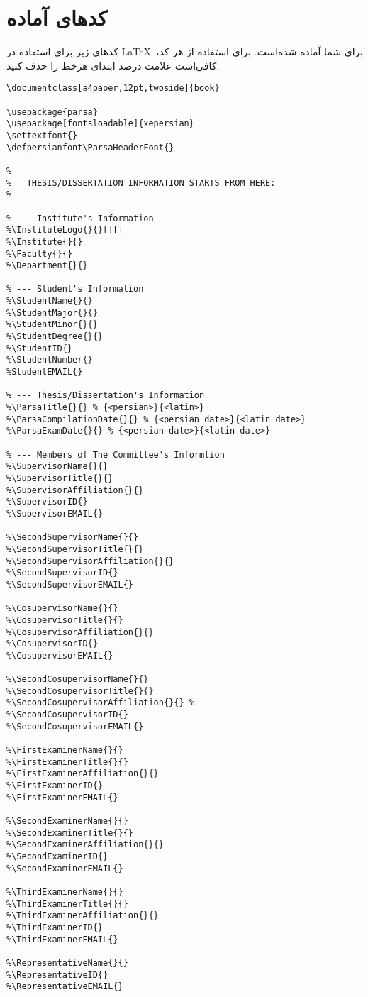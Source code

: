 \documentclass[12pt,a4paper,twoside,fleqn,notitlepage,openany]{extbook}
\begin{document}
\section{کدهای آماده}
کدهای زیر برای استفاده در \LaTeX ~برای شما آماده شده‌است. برای استفاده از هر کد، کافی‌است علامت درصد ابتدای هرخط را حذف کنید.
\begin{latin}
\begin{verbatim}
\documentclass[a4paper,12pt,twoside]{book}

\usepackage{parsa}
\usepackage[fontsloadable]{xepersian}
\settextfont{} 
\defpersianfont\ParsaHeaderFont{} 

%
%	THESIS/DISSERTATION INFORMATION STARTS FROM HERE:
%

% --- Institute's Information
%\InstituteLogo{}{}[][] 
%\Institute{}{}
%\Faculty{}{}
%\Department{}{} 

% --- Student's Information
%\StudentName{}{} 
%\StudentMajor{}{}
%\StudentMinor{}{}
%\StudentDegree{}{}
%\StudentID{}
%\StudentNumber{}
%StudentEMAIL{}

% --- Thesis/Dissertation's Information
%\ParsaTitle{}{} % {<persian>}{<latin>}
%\ParsaCompilationDate{}{} % {<persian date>}{<latin date>}
%\ParsaExamDate{}{} % {<persian date>}{<latin date>}

% --- Members of The Committee's Informtion
%\SupervisorName{}{} 
%\SupervisorTitle{}{}
%\SupervisorAffiliation{}{}
%\SupervisorID{}
%\SupervisorEMAIL{}

%\SecondSupervisorName{}{}
%\SecondSupervisorTitle{}{}
%\SecondSupervisorAffiliation{}{}
%\SecondSupervisorID{}
%\SecondSupervisorEMAIL{}

%\CosupervisorName{}{}
%\CosupervisorTitle{}{}
%\CosupervisorAffiliation{}{}
%\CosupervisorID{}
%\CosupervisorEMAIL{}

%\SecondCosupervisorName{}{}
%\SecondCosupervisorTitle{}{}
%\SecondCosupervisorAffiliation{}{} %
%\SecondCosupervisorID{}
%\SecondCosupervisorEMAIL{}

%\FirstExaminerName{}{}
%\FirstExaminerTitle{}{}
%\FirstExaminerAffiliation{}{}
%\FirstExaminerID{}
%\FirstExaminerEMAIL{}

%\SecondExaminerName{}{}
%\SecondExaminerTitle{}{}
%\SecondExaminerAffiliation{}{}
%\SecondExaminerID{}
%\SecondExaminerEMAIL{}

%\ThirdExaminerName{}{}
%\ThirdExaminerTitle{}{}
%\ThirdExaminerAffiliation{}{}
%\ThirdExaminerID{}
%\ThirdExaminerEMAIL{}

%\RepresentativeName{}{}
%\RepresentativeID{}
%\RepresentativeEMAIL{}



\end{verbatim}
\end{latin}
\end{document}
